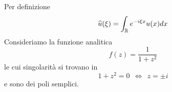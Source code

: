 \ParteSoluzioni

\Soluzione

Per definizione
\begin{equation*}
\hat{u}(\xi) = \int_{\RR} e^{- i\xi x} u(x) dx
\end{equation*}
Consideriamo la funzione analitica
\begin{equation*}
f(z) = \frac{1}{1 + z^{2}}
\end{equation*}
le cui singolarità si trovano in
\begin{equation*}
1 + z^{2} = 0\ \ \iff \ \ z = \pm i
\end{equation*}
e sono dei poli semplici.


\begin{figure}[htpb]
	\centering
{} %

\begin{tikzpicture}[x = 0.75pt, y = 0.75pt, yscale = -1, xscale = 1]


\end{tikzpicture}
\end{figure}
